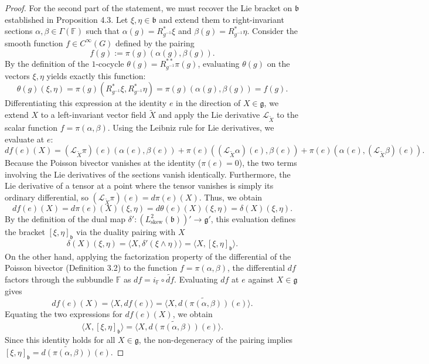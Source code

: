 \documentclass[11pt,reqno]{amsart}
\theoremstyle{definition}
\numberwithin{equation}{section}
\begin{document}
\begin{proof}
For the second part of the statement, we must recover the Lie bracket on $\mathfrak{b}$ established in Proposition 4.3. Let $\xi, \eta \in \mathfrak{b}$ and extend them to right-invariant sections $\alpha, \beta \in \Gamma(\mathbb{F})$ such that $\alpha(g) = R_{g^{-1}}^*\xi$ and $\beta(g) = R_{g^{-1}}^*\eta$. Consider the smooth function $f \in C^\infty(G)$ defined by the pairing
\[
f(g) := \pi(g)(\alpha(g), \beta(g)).
\]
By the definition of the $1$-cocycle $\theta(g) = R_{g^{-1}}^{**}\pi(g)$, evaluating $\theta(g)$ on the vectors $\xi, \eta$ yields exactly this function:
\[
\theta(g)(\xi, \eta) = \pi(g)(R_{g^{-1}}^*\xi, R_{g^{-1}}^*\eta) = \pi(g)(\alpha(g), \beta(g)) = f(g).
\]
Differentiating this expression at the identity $e$ in the direction of $X \in \mathfrak{g}$, we extend $X$ to a left-invariant vector field $\tilde{X}$ and apply the Lie derivative $\mathcal{L}_{\tilde{X}}$ to the scalar function $f = \pi(\alpha, \beta)$. Using the Leibniz rule for Lie derivatives, we evaluate at $e$:
\[
df(e)(X) = (\mathcal{L}_{\tilde{X}}\pi)(e)(\alpha(e), \beta(e)) + \pi(e)((\mathcal{L}_{\tilde{X}}\alpha)(e), \beta(e)) + \pi(e)(\alpha(e), (\mathcal{L}_{\tilde{X}}\beta)(e)).
\]
Because the Poisson bivector vanishes at the identity ($\pi(e) = 0$), the two terms involving the Lie derivatives of the sections vanish identically. Furthermore, the Lie derivative of a tensor at a point where the tensor vanishes is simply its ordinary differential, so $(\mathcal{L}_{\tilde{X}}\pi)(e) = d\pi(e)(X)$. Thus, we obtain
\[
df(e)(X) = d\pi(e)(X)(\xi, \eta) = d\theta(e)(X)(\xi, \eta) = \delta(X)(\xi, \eta).
\]
By the definition of the dual map $\delta': (L^2_{\text{skew}}(\mathfrak{b}))' \to \mathfrak{g}'$, this evaluation defines the bracket $[\xi, \eta]_{\mathfrak{b}}$ via the duality pairing with $X$
\[
\delta(X)(\xi, \eta) = \langle X, \delta'(\xi \wedge \eta) \rangle = \langle X, [\xi, \eta]_{\mathfrak{b}} \rangle.
\]
On the other hand, applying the factorization property of the differential of the Poisson bivector (Definition 3.2) to the function $f = \pi(\alpha, \beta)$, the differential $df$ factors through the subbundle $\mathbb{F}$ as $df = i_{\mathbb{F}} \circ \widetilde{df}$. Evaluating $df$ at $e$ against $X \in \mathfrak{g}$ gives
\[
df(e)(X) = \langle X, df(e) \rangle = \langle X, \widetilde{d(\pi(\alpha, \beta))}(e) \rangle.
\]
Equating the two expressions for $df(e)(X)$, we obtain
\[
\langle X, [\xi, \eta]_{\mathfrak{b}} \rangle = \langle X, \widetilde{d(\pi(\alpha, \beta))}(e) \rangle.
\]
Since this identity holds for all $X \in \mathfrak{g}$, the non-degeneracy of the pairing implies $[\xi, \eta]_{\mathfrak{b}} = \widetilde{d(\pi(\alpha, \beta))}(e)$.
\end{proof}
\end{document}
